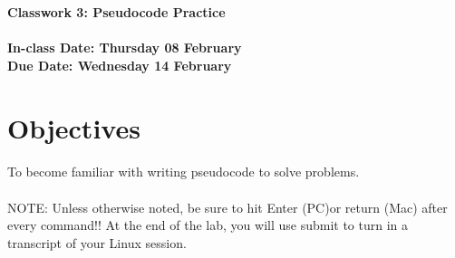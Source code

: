 \documentclass[letter,11pt]{article}
\begin{document}
\huge
\textbf{Classwork 3: Pseudocode Practice}
\normalsize
\\ ~~ \\
\textbf{In-class Date: Thursday 08 February} \\
\textbf{Due Date: Wednesday 14 February}

\section*{Objectives}
\paragraph{}To become familiar with writing pseudocode to solve problems.
\paragraph{}NOTE: Unless otherwise noted, be sure to hit Enter (PC)or return (Mac) after every command!! At the end of the lab, you will use submit to turn in a transcript of your Linux session. %
\end{document}

